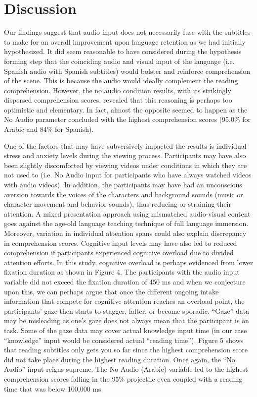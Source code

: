 \section{Discussion}\label{sec-discussion}

Our findings suggest that audio input does not necessarily fuse with the
subtitles to make for an overall improvement upon language retention as
we had initially hypothesized. It did seem reasonable to have considered
during the hypothesis forming step that the coinciding audio and visual
input of the language (i.e. Spanish audio with Spanish subtitles) would
bolster and reinforce comprehension of the scene. This is because the
audio would ideally complement the reading comprehension. However, the
no audio condition results, with its strikingly dispersed comprehension
scores, revealed that this reasoning is perhaps too optimistic and
elementary. In fact, almost the opposite seemed to happen as the No
Audio parameter concluded with the highest comprehension scores (95.0\%
for Arabic and 84\% for Spanish).

One of the factors that may have subversively impacted the results is
individual stress and anxiety levels during the viewing process.
Participants may have also been slightly discomforted by viewing videos
under conditions in which they are not used to (i.e. No Audio input for
participants who have always watched videos with audio videos). In
addition, the participants may have had an unconscious aversion towards
the voices of the characters and background sounds (music or character
movement and behavior sounds), thus reducing or straining their
attention. A mixed presentation approach using mismatched audio-visual
content goes against the age-old language teaching technique of full
language immersion. Moreover, variation in individual attention spans
could also explain discrepancy in comprehension scores. Cognitive input
levels may have also led to reduced comprehension if participants
experienced cognitive overload due to divided attention efforts. In this
study, cognitive overload is perhaps evidenced from lower fixation
duration as shown in Figure 4. The participants with the audio input
variable did not exceed the fixation duration of 450 ms and when we
conjecture upon this, we can perhaps argue that once the different
ongoing intake information that compete for cognitive attention reaches
an overload point, the participants' gaze then starts to stagger,
falter, or become sporadic. ``Gaze'' data may be misleading as one's
gaze does not always mean that the participant is on task. Some of the
gaze data may cover actual knowledge input time (in our case
``knowledge'' input would be considered actual ``reading time''). Figure
5 shows that reading subtitles only gets you so far since the highest
comprehension score did not take place during the highest reading
duration. Once again, the ``No Audio'' input reigns supreme. The No
Audio (Arabic) variable led to the highest comprehension scores falling
in the 95\% projectile even coupled with a reading time that was below
100,000 ms.

